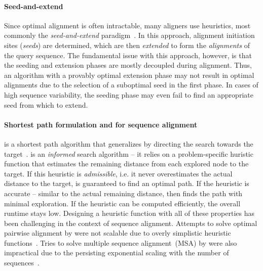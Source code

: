 \paragraph{Seed-and-extend}
Since optimal alignment is often intractable, many aligners use heuristics, most
commonly the \emph{seed-and-extend}
paradigm~\cite{altschul_basic_1990,langmead_fast_2012,li_fast_2009}. In this
approach, alignment initiation sites (\emph{seeds}) are determined, which are
then \emph{extended} to form the \emph{alignments} of the query sequence. The
fundamental issue with this approach, however, is that the seeding and extension
phases are mostly decoupled during alignment. Thus, an algorithm with a provably
optimal extension phase may not result in optimal alignments due to the
selection of a suboptimal seed in the first phase. In cases of high sequence
variability, the seeding phase may even fail to find an appropriate seed from
which to extend.

\paragraph{Shortest path formulation and \A for sequence alignment}
\A is a shortest path algorithm that generalizes \dijkstra by directing the
search towards the target~\citep{hart1968formal}. \A is an \emph{informed}
search algorithm -- it relies on a problem-specific huristic function that
estimates the remaining distance from each explored node to the target. If this
heuristic is \emph{admissible}, i.e. it never overestimates the actual distance
to the target, \A is guaranteed to find an optimal path. If the heuristic is
accurate -- similar to the actual remaining distance, then \A finds the path
with minimal exploration. If the heuristic can be computed efficiently, the
overall runtime stays low. Designing a heuristic function with all of these
properties has been challenging in the context of sequence alignment. Attempts
to solve optimal pairwise alignment by \A were not scalable due to overly
simplistic heuristic functions~\cite{dox2018efficient}. Tries to solve multiple
sequence alignment~(MSA) by \A were also impractical due to the persisting
exponential scaling with the number of
sequences~\citep{lermen2000practical,zhou2002multiple,mcnaughton2002memory}.

